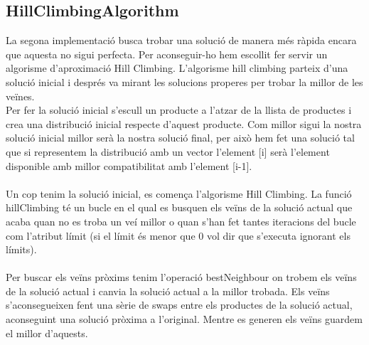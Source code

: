 \documentclass[a4paper, t]{article}
\begin{document}
\subsection{HillClimbingAlgorithm}
La segona implementació busca trobar una solució de manera més ràpida encara que aquesta no sigui perfecta. Per aconseguir-ho hem escollit fer servir un algorisme d’aproximació Hill Climbing. L’algorisme hill climbing parteix d’una solució inicial i després va mirant les solucions properes per trobar la millor de les veïnes.
\\
Per fer la solució inicial s’escull un producte a l'atzar de la llista de productes i crea una distribució inicial respecte d'aquest producte. Com millor sigui la nostra solució inicial millor serà la nostra solució final, per això hem fet una solució tal que si representem la distribució amb un vector l'element [i] serà l'element disponible amb millor compatibilitat amb l’element [i-1].
\\ \\
Un cop tenim la solució inicial, es comença l’algorisme Hill Climbing. La funció hillClimbing té un bucle en el qual es busquen els veïns de la solució actual que acaba quan no es troba un veí millor o quan s’han fet tantes iteracions del bucle com l’atribut límit (si el límit és menor que 0 vol dir que s’executa ignorant els límits).
\\ \\
Per buscar els veïns pròxims tenim l'operació bestNeighbour on trobem els veïns de la solució actual i canvia la solució actual a la millor trobada. Els veïns s'aconsegueixen fent una sèrie de swaps entre els productes de la solució actual, aconseguint una solució pròxima a l'original. Mentre es generen els veïns guardem el millor d’aquests.
\end{document}
